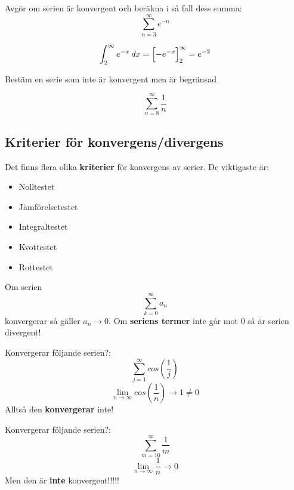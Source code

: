 \documentclass{report}
\begin{document}
\qs{}
{
Avgör om serien är konvergent och beräkna i så fall dess summa:
\begin{equation*}
	\sum_{n = 3}^{ \infty} e^{-n}
\end{equation*}
}

\sol
\begin{equation*}
	\int_{2}^{ \infty} e^{-x} \: dx  = \Bigl[ -e^{-x} \Bigr]_{2}^{ \infty } = e^{-2}
\end{equation*}

\qs{}
{
Bestäm en serie som inte är konvergent men är begränsad
}


\sol 
\begin{equation*}
\sum_{n = 8}^{ \infty} \frac{1}{n} 
\end{equation*}

\subsection{Kriterier för konvergens/divergens}
Det finns flera olika \textbf{kriterier} för konvergens av serier. De viktigaste är:
\begin{itemize}
	\item Nolltestet
	\item Jämförelsetestet
	\item Integraltestet
	\item Kvottestet
	\item Rottestet
\end{itemize}

{
Om serien
\begin{equation*}
\sum_{k = 0}^{ \infty} a_n
\end{equation*}
konvergerar så gäller $ a_n \to 0 $. Om \textbf{seriens termer} inte går mot 0 så är serien divergent!
}


\ex{}
{
Konvergerar följande serien?:
\begin{equation*}
\sum_{j = 1}^{ \infty} cos( \frac{1}{j}  )
\end{equation*}
\begin{equation*}
\lim_{n \to \infty} cos( \frac{1}{n} ) \to 1 \ne 0
\end{equation*}
Alltså den \textbf{konvergerar} inte!
}

\ex{}
{
Konvergerar följande serien?:
\begin{equation*}
\sum_{m = 10}^{ \infty} \frac{1}{m} 
\end{equation*}
\begin{equation*}
\lim_{n \to \infty} \frac{1}{n} \to 0
\end{equation*}
Men den är \textbf{inte} konvergent!!!!!
}
\end{document}
